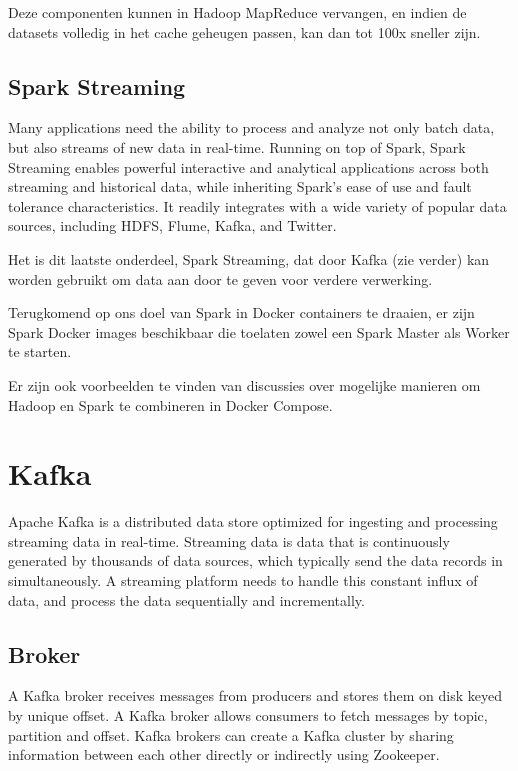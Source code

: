 Deze componenten kunnen in Hadoop MapReduce vervangen, en indien de datasets volledig in het cache geheugen passen, kan dan tot 100x sneller zijn.


\subsection{Spark Streaming}
Many applications need the ability to process and analyze not only batch data, but also streams of new data in real-time. Running on top of Spark, Spark Streaming enables powerful interactive and analytical applications across both streaming and historical data, while inheriting Spark’s ease of use and fault tolerance characteristics. It readily integrates with a wide variety of popular data sources, including HDFS, Flume, Kafka, and Twitter.\autocite{databricks2023}

Het is dit laatste onderdeel, Spark Streaming, dat door Kafka (zie verder) kan worden gebruikt om data aan door te geven voor verdere verwerking.

Terugkomend op ons doel van Spark in Docker containers te draaien, er zijn Spark Docker images beschikbaar die toelaten zowel een Spark Master als Worker te starten.

Er zijn ook voorbeelden te vinden van discussies over mogelijke manieren om Hadoop en Spark te combineren in Docker Compose.


\section{Kafka}
Apache Kafka is a distributed data store optimized for ingesting and processing streaming data in real-time. Streaming data is data that is continuously generated by thousands of data sources, which typically send the data records in simultaneously. A streaming platform needs to handle this constant influx of data, and process the data sequentially and incrementally.
\autocite{AwsAmazon2023b}

\subsection{Broker}
A Kafka broker receives messages from producers and stores them on disk keyed by unique offset. A Kafka broker allows consumers to fetch messages by topic, partition and offset. Kafka brokers can create a Kafka cluster by sharing information between each other directly or indirectly using Zookeeper.\autocite{GitBook2023}

